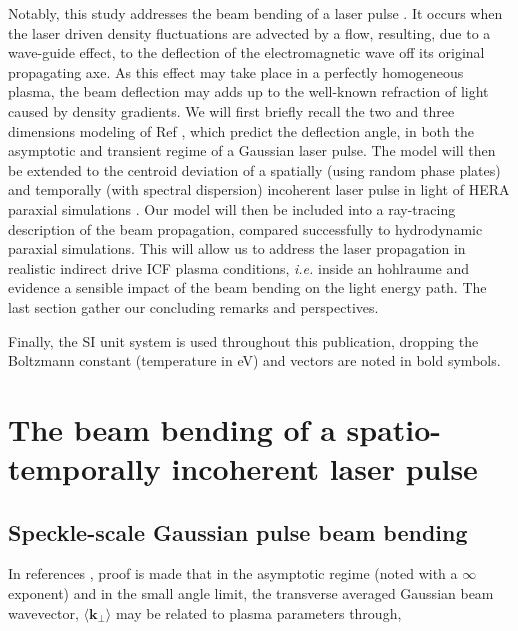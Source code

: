 \documentclass[%
 reprint,
 amsmath,amssymb,
 aps,
]{revtex4-1}
\begin{document}
Notably, this study  addresses the beam bending  of  a laser pulse \cite{PRL_Hinkel_1996,POP_Hinkel_1998,POP_Bezzerides_1998,POP_Rose_96,PRL_Montgomery} .
It occurs when the laser driven density fluctuations are advected by a flow, resulting,  due to a wave-guide effect, to the deflection of the electromagnetic wave off its original propagating axe. 
As this effect may take place in a perfectly homogeneous plasma, the beam deflection may adds up to the well-known refraction of light caused by density gradients. 
We will first briefly recall  the two and three dimensions modeling of Ref \cite[]{POP_Ruyer_2020}, which predict the deflection angle, in both the asymptotic and transient regime of a Gaussian laser pulse.
The model will then be extended to the centroid deviation of a spatially (using random phase plates) and temporally (with spectral dispersion) incoherent laser pulse in light of HERA paraxial simulations \cite{Loiseau_2006}.  
Our model  will then be included into 
a  ray-tracing description of the beam propagation, compared successfully to  hydrodynamic paraxial simulations. This will allow us to address the laser propagation in realistic indirect drive ICF plasma conditions, \emph{i.e.} inside an hohlraume and evidence a sensible impact of the beam bending on the light energy path. 
The last section gather our concluding remarks and perspectives. 

Finally, the SI unit system is used throughout this publication, dropping the Boltzmann constant (temperature in eV) and vectors are noted in bold symbols. 

\section{The beam bending of a spatio-temporally incoherent laser pulse}\label{sec:gauss}
\subsection{Speckle-scale Gaussian pulse beam bending}
In references \cite{POP_Rose_96,POP_Ruyer_2020}, proof is made that in the asymptotic regime (noted with a $\infty$ exponent) and in the small angle limit,  the transverse averaged Gaussian beam wavevector, $ \langle \mathbf{k}_\perp\rangle$ may be related to plasma parameters through,
 
\end{document}
